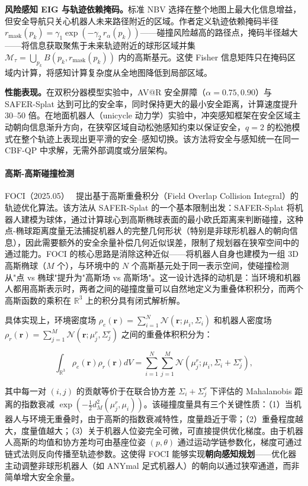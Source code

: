 \textbf{风险感知 EIG 与轨迹依赖掩码。}标准 NBV 选择在整个地图上最大化信息增益，但安全导航只关心机器人未来路径附近的区域。作者定义轨迹依赖掩码半径 $r_\text{mask}(p_k) = \gamma_1 \exp(-\gamma_2\, r_\alpha(p_k))$——碰撞风险越高的路径点，掩码半径越大——将信息获取聚焦于未来轨迹附近的球形区域并集 $\mathcal{M}_\tau = \bigcup_{p_k} B(p_k, r_\text{mask}(p_k))$ 内的高斯基元。这使 Fisher 信息矩阵只在掩码区域内计算，将感知计算复杂度从全地图降低到局部区域。

\textbf{性能表现。}在双积分器模型实验中，AV@R 安全屏障（$\alpha=0.75, 0.90$）与 SAFER-Splat 达到可比的安全率，同时保持更大的最小安全距离，计算速度提升 30--50 倍。在地面机器人（unicycle 动力学）实验中，冲突感知框架在安全区域主动朝向信息渐升方向，在狭窄区域自动松弛感知约束以保证安全，$q=2$ 的松弛模式在整个轨迹上表现出更平滑的安全--感知切换。该方法将安全与感知统一在同一 CBF-QP 中求解，无需外部调度或分层架构。

\paragraph{高斯-高斯碰撞检测}

FOCI（2025.05）~\cite{2505_08510} 提出基于高斯重叠积分（Field Overlap Collision Integral）的轨迹优化算法。该方法从 SAFER-Splat 的一个基本限制出发：SAFER-Splat 将机器人建模为球体，通过计算球心到高斯椭球表面的最小欧氏距离来判断碰撞，这种点-椭球距离度量无法捕捉机器人的完整几何形状（特别是非球形机器人的朝向信息），因此需要额外的安全余量补偿几何近似误差，限制了规划器在狭窄空间中的通过能力。FOCI 的核心思路是消除这种近似——将机器人自身也建模为一组 3D 高斯椭球（$M$ 个），与环境中的 $N$ 个高斯基元处于同一表示空间，使碰撞检测从"点 vs 椭球"提升为"高斯场 vs 高斯场"。这一设计选择的动机是：当环境和机器人都用高斯表示时，两者之间的碰撞度量可以自然地定义为重叠体积积分，而两个高斯函数的乘积在 $\mathbb{R}^3$ 上的积分具有闭式解析解。

具体实现上，环境密度场 $\rho_e(\mathbf{r}) = \sum_{i=1}^{N} \mathcal{N}(\mathbf{r}; \mu_i, \Sigma_i)$ 和机器人密度场 $\rho_r(\mathbf{r}) = \sum_{j=1}^{M} \mathcal{N}(\mathbf{r}; \mu_j^r, \Sigma_j^r)$ 之间的重叠体积积分为：

\begin{equation}
    \int_{\mathbb{R}^3} \rho_e(\mathbf{r}) \rho_r(\mathbf{r}) dV = \sum_{i=1}^{N} \sum_{j=1}^{M} \mathcal{N}(\mu_j^r; \mu_i, \Sigma_i + \Sigma_j^r),
\end{equation}

其中每一对 $(i,j)$ 的贡献等价于在联合协方差 $\Sigma_i + \Sigma_j^r$ 下评估的 Mahalanobis 距离的指数衰减 $\exp(-\frac{1}{2} d_M^2(\mu_j^r, \mu_i))$。该碰撞度量具有三个关键性质：（1）当机器人与环境无重叠时，由于高斯的指数衰减特性，度量趋近于零；（2）重叠程度越大，度量值越大；（3）关于机器人位姿完全可微，可直接提供优化梯度。由于机器人高斯的均值和协方差均可由基座位姿 $(p, \theta)$ 通过运动学链参数化，梯度可通过链式法则反向传播至轨迹参数。这使得 FOCI 能够实现\textbf{朝向感知规划}——优化器主动调整非球形机器人（如 ANYmal 足式机器人）的朝向以通过狭窄通道，而非简单增大安全余量。

